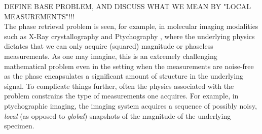 


DEFINE BASE PROBLEM, AND DISCUSS WHAT WE MEAN BY "LOCAL MEASUREMENTS"!!!\\

The phase
retrieval problem \cite{balan2006signal,shechtman2015phase} is seen, for example, in
molecular imaging modalities such as X-Ray crystallography and
Ptychography \cite{Rodenburg2008}, where the underlying physics dictates
that we can only acquire (squared) magnitude or phaseless measurements.
As one may imagine, this is an extremely challenging
mathematical problem even in the setting when the measurements are noise-free as the phase encapsulates a significant amount of
structure in the underlying signal. %
To complicate things further, often the physics associated with the problem constrains the type of measurements one acquires. For example, in ptychographic
imaging, the imaging system acquires a sequence of possibly noisy, {\em local} (as
opposed to {\em global}) snapshots of the magnitude of the underlying specimen. %

